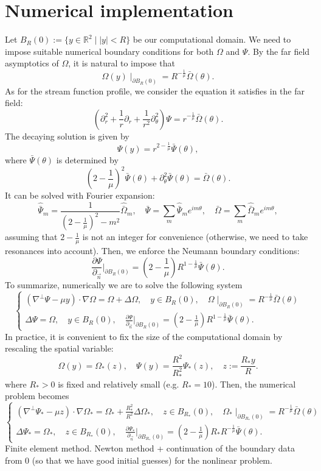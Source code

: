 \documentclass{article}
\newcommand{\reall}{\mathbb{R}}
\newcommand{\dr}[1]{\left(#1\right)}
\newcommand{\pa}{\partial}
\numberwithin{equation}{section}
\begin{document}
\section{Numerical implementation}
Let $B_R(0):= \{y\in\reall^2\mid|y|< R\}$ be our computational domain. We need to impose suitable numerical boundary conditions for both $\Omega$ and $\Psi$. By the far field asymptotics of $\Omega$, it is natural to impose that
\[
    \Omega(y)\mid_{\pa B_R(0)} = R^{-\frac{1}{\mu}}\bar\Omega(\theta).
\]
As for the stream function profile, we consider the equation it satisfies in the far field:
\[
    \dr{\pa^2_r+\frac{1}{r}\pa_r+\frac{1}{r^2}\pa^2_\theta}\Psi = r^{-\frac{1}{\mu}}\bar\Omega(\theta).
\]
The decaying solution is given by
\[
    \Psi(y) = r^{2-\frac{1}{\mu}}\bar\Psi(\theta),
\]
where $\bar\Psi(\theta)$ is determined by
\[
    \dr{2-\frac{1}{\mu}}^2\bar\Psi(\theta)+\pa^2_\theta\bar\Psi(\theta) = \bar\Omega(\theta).
\]
It can be solved with Fourier expansion:
\begin{equation}
    \hat{\bar\Psi}_m = \frac{1}{\dr{2-\frac{1}{\mu}}^2-m^2}\hat{\bar\Omega}_m,\quad \bar\Psi = \sum_m \hat{\bar\Psi}_me^{im\theta},\quad \bar\Omega = \sum_m \hat{\bar\Omega}_me^{im\theta},
\end{equation}
assuming that $2-\frac{1}{\mu}$ is not an integer for convenience (otherwise, we need to take resonances into account). Then, we enforce the Neumann boundary conditions:
\[
    \frac{\pa\Psi}{\pa_{\vec n}}\Big|_{\pa B_R(0)} = \dr{2-\frac{1}{\mu}}R^{1-\frac{1}{\mu}}\bar\Psi(\theta).
\]
To summarize, numerically we are to solve the following system
\begin{equation}
\begin{cases}
    (\nabla^\perp\Psi-\mu y)\cdot\nabla\Omega = \Omega+\Delta\Omega,\quad y\in B_R(0),\quad \Omega\mid_{\pa B_{R}(0)} = R^{-\frac{1}{\mu}}\bar\Omega(\theta)\\[4pt]
    \Delta\Psi = \Omega,\quad y\in B_R(0),\quad \frac{\pa\Psi}{\pa_{\vec n}}\Big|_{\pa B_R(0)} = \dr{2-\frac{1}{\mu}}R^{1-\frac{1}{\mu}}\bar\Psi(\theta).
\end{cases}
\end{equation}
In practice, it is convenient to fix the size of the computational domain by rescaling the spatial variable:
\[
    \Omega(y) = \Omega_*(z),\quad \Psi(y) = \frac{R^2}{R^2_*}\Psi_*(z),\quad z:=\frac{R_* y}{R}.
\]
where $R_*>0$ is fixed and relatively small (e.g. $R_*=10$). Then, the numerical problem becomes
\begin{equation}\label{solving the profiles: numerical formulation}
\begin{cases}
    (\nabla^\perp\Psi_*-\mu z)\cdot\nabla\Omega_* = \Omega_*+\frac{R^2_*}{R^2}\Delta\Omega_*,\quad z\in B_{R_*}(0),\quad \Omega_*\mid_{\pa B_{R_*}(0)} = R^{-\frac{1}{\mu}}\bar\Omega(\theta)\\[4pt]
    \Delta\Psi_* = \Omega_*,\quad z\in B_{R_*}(0),\quad \frac{\pa\Psi_*}{\pa_{\vec n}}\Big|_{\pa B_{R_*}(0)} = \dr{2-\frac{1}{\mu}}R_*R^{-\frac{1}{\mu}}\bar\Psi(\theta).
\end{cases}
\end{equation}
Finite element method. Newton method  + continuation of the boundary data from $0$ (so that we have good initial guesses) for the nonlinear problem.
\end{document}
